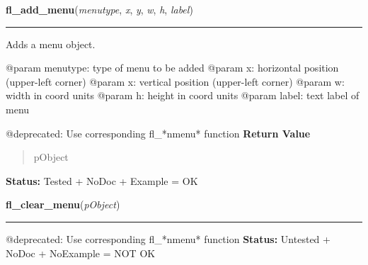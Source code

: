     \vspace{0.5ex}

\hspace{.8\funcindent}\begin{boxedminipage}{\funcwidth}

    \raggedright \textbf{fl\_add\_menu}(\textit{menutype}, \textit{x}, \textit{y}, \textit{w}, \textit{h}, \textit{label})

    \vspace{-1.5ex}

    \rule{\textwidth}{0.5\fboxrule}
\setlength{\parskip}{2ex}

Adds a menu object.

@param menutype: type of menu to be added
@param x: horizontal position (upper-left corner)
@param x: vertical position (upper-left corner)
@param w: width in coord units
@param h: height in coord units
@param label: text label of menu

@deprecated: Use corresponding fl\_*nmenu* function
\setlength{\parskip}{1ex}
      \textbf{Return Value}
    \vspace{-1ex}

      \begin{quote}

pObject
      \end{quote}

\textbf{Status:} 
Tested + NoDoc + Example = OK


    \end{boxedminipage}

    \label{xformslib:deprecated:fl_clear_menu}

    \vspace{0.5ex}

\hspace{.8\funcindent}\begin{boxedminipage}{\funcwidth}

    \raggedright \textbf{fl\_clear\_menu}(\textit{pObject})

    \vspace{-1.5ex}

    \rule{\textwidth}{0.5\fboxrule}
\setlength{\parskip}{2ex}

@deprecated: Use corresponding fl\_*nmenu* function
\setlength{\parskip}{1ex}
\textbf{Status:} 
Untested + NoDoc + NoExample = NOT OK


    \end{boxedminipage}

